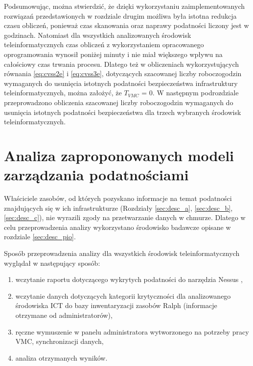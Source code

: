 \bigbreak
Podsumowując, można stwierdzić, że dzięki wykorzystaniu zaimplementowanych rozwiązań przedstawionych w rozdziale drugim możliwa była istotna redukcja czasu obliczeń, ponieważ czas skanowania oraz naprawy podatności liczony jest w godzinach. Natomiast dla wszystkich analizowanych środowisk teleinformatycznych czas obliczeń z wykorzystaniem opracowanego oprogramowania wynosił poniżej minuty i nie miał większego wpływu na całościowy czas trwania procesu. Dlatego też w obliczeniach wykorzystujących równania \ref{eq:cvss2e} i \ref{eq:cvss3e}, dotyczących szacowanej liczby roboczogodzin wymaganych do usunięcia istotnych podatności bezpieczeństwa infrastruktury teleinformatycznych, można założyć, że $T_{VMC}$ = 0. W następnym podrozdziale przeprowadzono obliczenia szacowanej liczby roboczogodzin wymaganych do usunięcia istotnych podatności bezpieczeństwa dla trzech wybranych środowisk teleinformatycznych.


\section{Analiza zaproponowanych modeli zarządzania podatnościami}
Właściciele zasobów, od których pozyskano informacje na temat podatności znajdujących się w ich infrastrukturze (Rozdziały \ref{sec:desc_a}, \ref{sec:desc_b}, \ref{sec:desc_c}), nie wyrazili zgody na przetwarzanie danych w chmurze. Dlatego w celu przeprowadzenia analizy wykorzystano środowisko badawcze opisane w rozdziale \ref{sec:desc_pio}.

\bigbreak
Sposób przeprowadzenia analizy dla wszystkich środowisk teleinformatycznych wyglądał w następujący sposób:
\begin{enumerate}
    \item wczytanie raportu dotyczącego wykrytych podatności do narzędzia Nessus \cite{beale2004nessus},
    \item wczytanie danych dotyczących kategorii krytyczności dla analizowanego środowiska ICT do bazy inwentaryzacji zasobów Ralph \cite{ralph} (informacje otrzymane od administratorów),
    \item ręczne wymuszenie w panelu administratora wytworzonego na potrzeby pracy VMC, synchronizacji danych,
    \item analiza otrzymanych wyników.
\end{enumerate}



